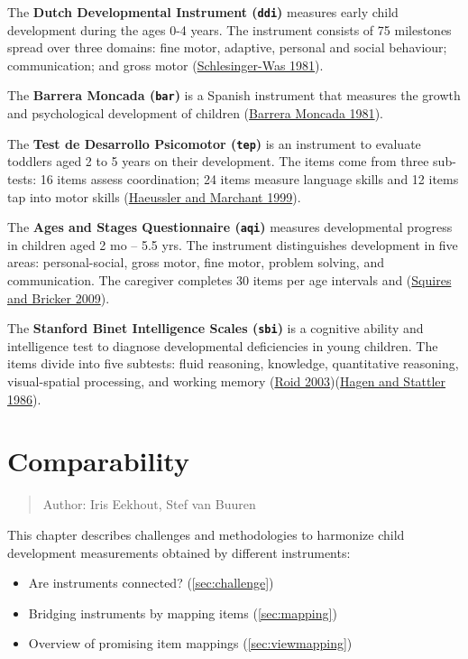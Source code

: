 \documentclass[
]{book}
\providecommand{\tightlist}{%
  \setlength{\itemsep}{0pt}\setlength{\parskip}{0pt}}
\begin{document}
The \textbf{Dutch Developmental Instrument (\texttt{ddi})} measures early child development during the ages 0-4 years. The instrument consists of 75 milestones spread over three domains: fine motor, adaptive, personal and social behaviour; communication; and gross motor (\protect\hyperlink{ref-schlesinger1981}{Schlesinger-Was 1981}).

The \textbf{Barrera Moncada (\texttt{bar})} is a Spanish instrument that measures the growth and psychological development of children (\protect\hyperlink{ref-barrera1981}{Barrera Moncada 1981}).

The \textbf{Test de Desarrollo Psicomotor (\texttt{tep})} is an instrument to evaluate toddlers aged 2 to 5 years on their development. The items come from three sub-tests: 16 items assess coordination; 24 items measure language skills and 12 items tap into motor skills (\protect\hyperlink{ref-haeussler1999}{Haeussler and Marchant 1999}).

The \textbf{Ages and Stages Questionnaire (\texttt{aqi})} measures developmental progress in children aged 2 mo -- 5.5 yrs. The instrument distinguishes development in five areas: personal-social, gross motor, fine motor, problem solving, and communication. The caregiver completes 30 items per age intervals and (\protect\hyperlink{ref-squires2009}{Squires and Bricker 2009}).

The \textbf{Stanford Binet Intelligence Scales (\texttt{sbi})} is a cognitive ability and intelligence test to diagnose developmental deficiencies in young children. The items divide into five subtests: fluid reasoning, knowledge, quantitative reasoning, visual-spatial processing, and working memory (\protect\hyperlink{ref-roid2003}{Roid 2003})(\protect\hyperlink{ref-hagen1986}{Hagen and Stattler 1986}).

\hypertarget{ch:comparability}{%
\chapter{Comparability}\label{ch:comparability}}

\begin{quote}
Author: Iris Eekhout, Stef van Buuren
\end{quote}

This chapter describes challenges and methodologies to harmonize child development measurements obtained by different instruments:

\begin{itemize}
\tightlist
\item
  Are instruments connected? (\ref{sec:challenge})
\item
  Bridging instruments by mapping items (\ref{sec:mapping})
\item
  Overview of promising item mappings (\ref{sec:viewmapping})
\end{itemize}
\end{document}
